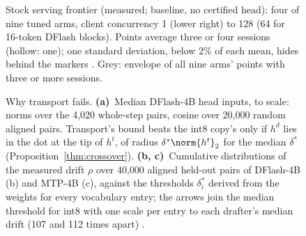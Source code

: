 \begin{figure}[t]
\centering
%
\caption{Stock serving frontier (measured; baseline, no certified head): four of nine tuned arms, client concurrency 1 (lower right) to 128 (64 for 16-token DFlash blocks). Points average three or four sessions (hollow: one); one standard deviation, below 2\% of each mean, hides behind the markers . Grey: envelope of all nine arms' points with three or more sessions.}
\label{fig:frontier}
\end{figure}

\begin{figure}[t]
\centering
%
\caption{Why transport fails. \textbf{(a)}~Median DFlash-4B head inputs, to scale: norms over the 4,020 whole-step pairs, cosine over 20,000 random aligned pairs. Transport's bound beats the int8 copy's only if $h^d$ lies in the dot at the tip of $h^t$, of radius $\delta^\ast\norm{h^t}_2$ for the median $\delta^\ast$ (Proposition~\ref{thm:crossover}). \textbf{(b, c)}~Cumulative distributions of the measured drift $\rho$ over 40,000 aligned held-out pairs of DFlash-4B (b) and MTP-4B (c), against the thresholds $\delta^\ast_i$ derived from the weights for every vocabulary entry; the arrows join the median threshold for int8 with one scale per entry to each drafter's median drift (107 and 112 times apart) .}
\label{fig:rho}\label{fig:transport}
\end{figure}

